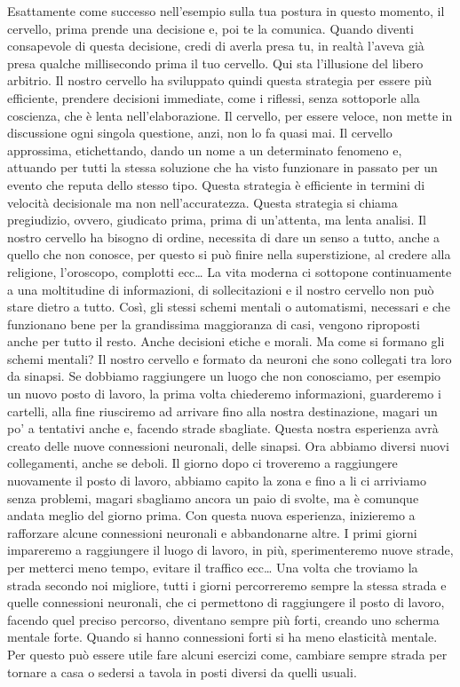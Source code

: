 \documentclass[12pt]{book} %
\begin{document}
Esattamente come successo nell'esempio sulla tua postura in questo momento, il cervello, prima
prende una decisione e, poi te la comunica. Quando diventi consapevole di questa decisione, credi di averla presa tu,
in realtà l'aveva già presa qualche millisecondo prima il tuo cervello. Qui sta
l'illusione del libero arbitrio. Il nostro cervello ha sviluppato quindi questa strategia per
essere più efficiente, prendere decisioni immediate, come i riflessi, senza sottoporle alla coscienza, che è lenta
nell'elaborazione. Il cervello, per essere veloce, non mette in discussione ogni singola
questione, anzi, non lo fa quasi mai. Il cervello approssima, etichettando, dando un nome a un determinato fenomeno e,
attuando per tutti la stessa soluzione che ha visto funzionare in passato per un evento che reputa dello stesso tipo.
Questa strategia è efficiente in termini di velocità decisionale ma non nell'accuratezza. Questa
strategia si chiama pregiudizio, ovvero, giudicato prima, prima di un'attenta, ma lenta analisi.
Il nostro cervello ha bisogno di ordine, necessita di dare un senso a tutto, anche a quello che non conosce, per questo
si può finire nella superstizione, al credere alla religione, l'oroscopo, complotti ecc… La vita
moderna ci sottopone continuamente a una moltitudine di informazioni, di sollecitazioni e il nostro cervello non può
stare dietro a tutto. Così, gli stessi schemi mentali o automatismi, necessari e che funzionano bene per la grandissima
maggioranza di casi, vengono riproposti anche per tutto il resto. Anche decisioni etiche e morali. Ma come si formano
gli schemi mentali? Il nostro cervello e formato da neuroni che sono collegati tra loro da sinapsi. Se dobbiamo
raggiungere un luogo che non conosciamo, per esempio un nuovo posto di lavoro, la prima volta chiederemo informazioni,
guarderemo i cartelli, alla fine riusciremo ad arrivare fino alla nostra destinazione, magari un po' a tentativi anche
e, facendo strade sbagliate. Questa nostra esperienza avrà creato delle nuove connessioni neuronali, delle sinapsi. Ora
abbiamo diversi nuovi collegamenti, anche se deboli. Il giorno dopo ci troveremo a raggiungere nuovamente il posto di
lavoro, abbiamo capito la zona e fino a li ci arriviamo senza problemi, magari sbagliamo ancora un paio di svolte, ma è
comunque andata meglio del giorno prima. Con questa nuova esperienza, inizieremo a rafforzare alcune connessioni
neuronali e abbandonarne altre. I primi giorni impareremo a raggiungere il luogo di lavoro, in più, sperimenteremo
nuove strade, per metterci meno tempo, evitare il traffico ecc… Una volta che troviamo la strada secondo noi migliore,
tutti i giorni percorreremo sempre la stessa strada e quelle connessioni neuronali, che ci permettono di raggiungere il
posto di lavoro, facendo quel preciso percorso, diventano sempre più forti, creando uno scherma mentale forte. Quando
si hanno connessioni forti si ha meno elasticità mentale. Per questo può essere utile fare alcuni esercizi come,
cambiare sempre strada per tornare a casa o sedersi a tavola in posti diversi da quelli usuali.
\end{document}
